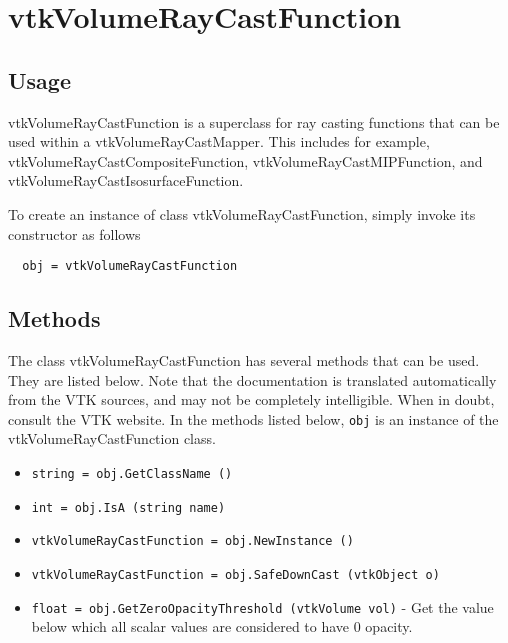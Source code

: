 \section{vtkVolumeRayCastFunction}

\subsection{Usage}

 vtkVolumeRayCastFunction is a superclass for ray casting functions that 
 can be used within a vtkVolumeRayCastMapper. This includes for example,
 vtkVolumeRayCastCompositeFunction, vtkVolumeRayCastMIPFunction, and
 vtkVolumeRayCastIsosurfaceFunction.

To create an instance of class vtkVolumeRayCastFunction, simply
invoke its constructor as follows
\begin{verbatim}
  obj = vtkVolumeRayCastFunction
\end{verbatim}
\subsection{Methods}

The class vtkVolumeRayCastFunction has several methods that can be used.
  They are listed below.
Note that the documentation is translated automatically from the VTK sources,
and may not be completely intelligible.  When in doubt, consult the VTK website.
In the methods listed below, \verb|obj| is an instance of the vtkVolumeRayCastFunction class.
\begin{itemize}
\item  \verb|string = obj.GetClassName ()|

\item  \verb|int = obj.IsA (string name)|

\item  \verb|vtkVolumeRayCastFunction = obj.NewInstance ()|

\item  \verb|vtkVolumeRayCastFunction = obj.SafeDownCast (vtkObject o)|

\item  \verb|float = obj.GetZeroOpacityThreshold (vtkVolume vol)| -  Get the value below which all scalar values are considered to
 have 0 opacity.

\end{itemize}
